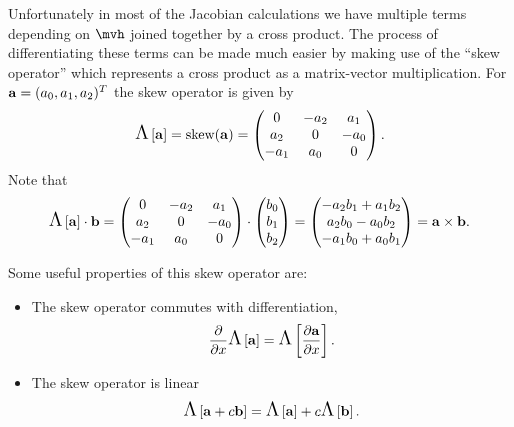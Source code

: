 {Unfortunately in most of the Jacobian calculations we have multiple terms depending on $\mvh$ joined together by a cross product.
The process of differentiating these terms can be made much easier by making use of the ``skew operator'' which represents a cross product as a matrix-vector multiplication.
For ${\boldsymbol{\mathrm{a}}} = (a_0, a_1, a_2)^T$ the skew operator is given by
\begin{equation}
  \text{\Large{$\Lambda$}}\left[ {\boldsymbol{\mathrm{a}}} \right] = \text{skew}({\boldsymbol{\mathrm{a}}}) =
  \begin{pmatrix}
    0 & -a_2 & a_1 \\
    a_2 & 0 & -a_0 \\
    -a_1 & a_0 & 0
  \end{pmatrix}.
  \label{eqn:skew}
\end{equation}
Note that
\begin{equation}
  \text{\Large{$\Lambda$}}\left[ {\boldsymbol{\mathrm{a}}} \right] \cdot {\boldsymbol{\mathrm{b}}}
  = \begin{pmatrix}
    0 & -a_2 & a_1 \\
    a_2 & 0 & -a_0 \\
    -a_1 & a_0 & 0
  \end{pmatrix}
  \cdot \begin{pmatrix} b_0 \\ b_1 \\ b_2 \end{pmatrix}
  = \begin{pmatrix} -a_2b_1 + a_1b_2 \\ a_2b_0 - a_0b_2 \\ -a_1b_0 + a_0b_1 \end{pmatrix}
  = {\boldsymbol{\mathrm{a}}} \times {\boldsymbol{\mathrm{b}}}.
\end{equation}

Some useful properties of this skew operator are:
\begin{itemize}
\item The skew operator commutes with differentiation, \ie
  \begin{equation}
    \frac{\partial }{\partial x} \text{\Large{$\Lambda$}}\left[ {\boldsymbol{\mathrm{a}}} \right] = \text{\Large{$\Lambda$}}\left[  \frac{\partial {\boldsymbol{\mathrm{a}}}}{\partial x}  \right].
  \end{equation}

\item The skew operator is linear
  \begin{equation}
    \text{\Large{$\Lambda$}}\left[ {\boldsymbol{\mathrm{a}}} + c {\boldsymbol{\mathrm{b}}} \right] = \text{\Large{$\Lambda$}}\left[ {\boldsymbol{\mathrm{a}}} \right] + c \text{\Large{$\Lambda$}}\left[ {\boldsymbol{\mathrm{b}}} \right].
  \end{equation}


\end{itemize}}
